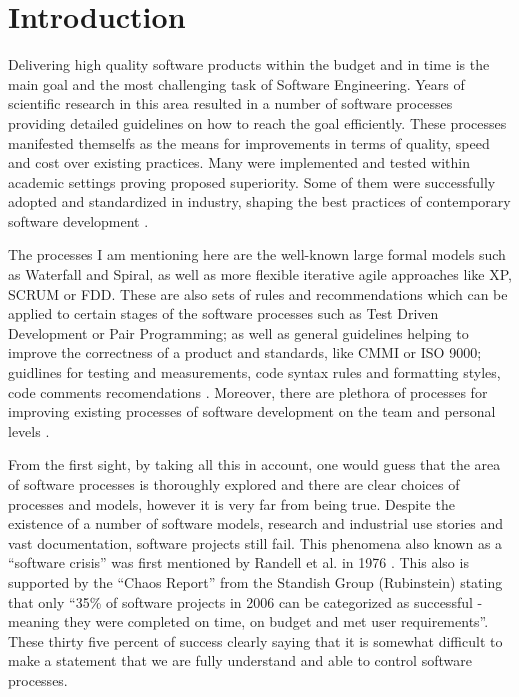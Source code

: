 \chapter{Introduction}
Delivering high quality software products within the budget and in time is the main goal and the most 
challenging task of Software Engineering. Years of scientific research in this area resulted in a 
number of software processes providing detailed guidelines on how to reach 
the goal efficiently. These processes manifested themselfs as the means for improvements in terms 
of quality, speed and cost over existing practices. Many were implemented and tested within academic 
settings proving proposed superiority. Some of them were successfully adopted and standardized 
in industry, shaping the best practices of contemporary software development \cite{citeulike:9962021}. 

The processes I am mentioning here are the well-known large formal models such as Waterfall and Spiral, 
as well as more flexible iterative agile approaches like XP, SCRUM or FDD. These are also sets of 
rules and recommendations which can be applied to certain stages of the software processes 
such as Test Driven Development or Pair Programming; as well as general guidelines helping 
to improve the correctness of a product and standards, like CMMI or ISO 9000; guidlines for testing 
and measurements, code syntax rules and formatting styles, code comments 
recomendations \cite{citeulike:900855}. Moreover, there are plethora of processes for 
improving existing processes of software development on the team \cite{citeulike:9962027} 
and personal levels \cite{citeulike:9962022}.

From the first sight, by taking all this in account, one would guess that the area of software 
processes is thoroughly explored and there are clear choices of processes and models,  
however it is very far from being true. Despite the existence of a number of software models,
research and industrial use stories and vast documentation, software projects still fail. 
This phenomena also known as a ``software crisis'' was first mentioned by Randell et al. in 1976 
\cite{naur1976software}. This also is supported by the ``Chaos Report'' from the Standish 
Group (Rubinstein) \cite{SDTimes} stating that only ``35\% of software projects in 2006 can 
be categorized as successful - meaning they were completed on time, on budget and met 
user requirements''. These thirty five percent of success clearly saying that it is somewhat 
difficult to make a statement that we are fully understand and able to control software processes. 

